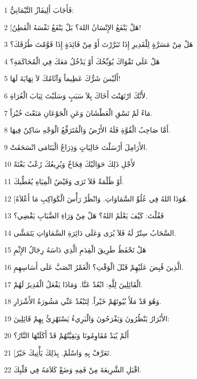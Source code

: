 \par 1 فَأَجَابَ أَلِيفَازُ التَّيْمَانِيُّ:
\par 2 [هَلْ يَنْفَعُ الإِنْسَانُ اللهَ؟ بَلْ يَنْفَعُ نَفْسَهُ الْفَطِنُ!
\par 3 هَلْ مِنْ مَسَرَّةٍ لِلْقَدِيرِ إِذَا تَبَرَّرْتَ أَوْ مِنْ فَائِدَةٍ إِذَا قَوَّمْتَ طُرُقَكَ؟
\par 4 هَلْ عَلَى تَقْوَاكَ يُوَبِّخُكَ أَوْ يَدْخُلُ مَعَكَ فِي الْمُحَاكَمَةِ؟
\par 5 أَلَيْسَ شَرُّكَ عَظِيماً وَآثَامُكَ لاَ نِهَايَةَ لَهَا!
\par 6 لأَنَّكَ ارْتَهَنْتَ أَخَاكَ بِلاَ سَبَبٍ وَسَلَبْتَ ثِيَابَ الْعُرَاةِ.
\par 7 مَاءً لَمْ تَسْقِ الْعَطْشَانَ وَعَنِ الْجَوْعَانِ مَنَعْتَ خُبْزاً.
\par 8 أَمَّا صَاحِبُ الْقُوَّةِ فَلَهُ الأَرْضُ وَالْمُتَرَفِّعُ الْوَجْهِ سَاكِنٌ فِيهَا.
\par 9 الأَرَامِلَ أَرْسَلْتَ خَالِيَاتٍ وَذِرَاعُ الْيَتَامَى انْسَحَقَتْ.
\par 10 لأَجْلِ ذَلِكَ حَوَالَيْكَ فِخَاخٌ وَيُرِيعُكَ رُعْبٌ بَغْتَةً
\par 11 أَوْ ظُلْمَةٌ فَلاَ تَرَى وَفَيْضُ الْمِيَاهِ يُغَطِّيكَ.
\par 12 [هُوَذَا اللهُ فِي عُلُوِّ السَّمَاوَاتِ. وَانْظُرْ رَأْسَ الْكَوَاكِبِ مَا أَعْلاَهُ.
\par 13 فَقُلْتَ: كَيْفَ يَعْلَمُ اللهُ؟ هَلْ مِنْ وَرَاءِ الضَّبَابِ يَقْضِي؟
\par 14 السَّحَابُ سِتْرٌ لَهُ فَلاَ يُرَى وَعَلَى دَائِرَةِ السَّمَاوَاتِ يَتَمَشَّى.
\par 15 هَلْ تَحْفَظُ طَرِيقَ الْقِدَمِ الَّذِي دَاسَهُ رِجَالُ الإِثْمِ
\par 16 الَّذِينَ قُبِضَ عَلَيْهِمْ قَبْلَ الْوَقْتِ؟ الْغَمْرُ انْصَبَّ عَلَى أَسَاسِهِمِ.
\par 17 الْقَائِلِينَ لِلَّهِ: ابْعُدْ عَنَّا. وَمَاذَا يَفْعَلُ الْقَدِيرُ لَهُمْ.
\par 18 وَهُوَ قَدْ مَلَأَ بُيُوتَهُمْ خَيْراً. لِتَبْعُدْ عَنِّي مَشُورَةُ الأَشْرَارِ.
\par 19 الأَبْرَارُ يَنْظُرُونَ وَيَفْرَحُونَ وَالْبَرِيءُ يَسْتَهْزِئُ بِهِمْ قَائِلِينَ:
\par 20 أَلَمْ يُبَدْ مُقَاوِمُونَا وَبَقِيَّتُهُمْ قَدْ أَكَلَتْهَا النَّارُ؟
\par 21 [تَعَرَّفْ بِهِ وَاسْلَمْ. بِذَلِكَ يَأْتِيكَ خَيْرٌ.
\par 22 اقْبَلِ الشَّرِيعَةَ مِنْ فَمِهِ وَضَعْ كَلاَمَهُ فِي قَلْبِكَ.
